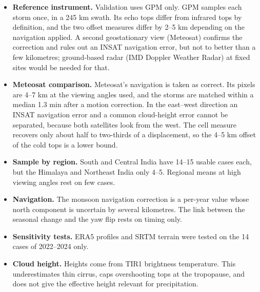 \begin{itemize}
\tightlist
\item
  \textbf{Reference instrument.} Validation uses GPM only. GPM samples each storm once, in a 245 km swath. Its echo tops differ from infrared tops by definition, and the two offset measures differ by 2--5 km depending on the navigation applied. A second geostationary view (Meteosat) confirms the correction and rules out an INSAT navigation error, but not to better than a few kilometres; ground-based radar (IMD Doppler Weather Radar) at fixed sites would be needed for that.
\item
  \textbf{Meteosat comparison.} Meteosat's navigation is taken as correct. Its pixels are 4--7 km at the viewing angles used, and the storms are matched within a median 1.3 min after a motion correction. In the east--west direction an INSAT navigation error and a common cloud-height error cannot be separated, because both satellites look from the west. The cell measure recovers only about half to two-thirds of a displacement, so the 4--5 km offset of the cold tops is a lower bound.
\item
  \textbf{Sample by region.} South and Central India have 14--15 usable cases each, but the Himalaya and Northeast India only 4--5. Regional means at high viewing angles rest on few cases.
\item
  \textbf{Navigation.} The monsoon navigation correction is a per-year value whose north component is uncertain by several kilometres. The link between the seasonal change and the yaw flip rests on timing only.
\item
  \textbf{Sensitivity tests.} ERA5 profiles and SRTM terrain were tested on the 14 cases of 2022--2024 only.
\item
  \textbf{Cloud height.} Heights come from TIR1 brightness temperature. This underestimates thin cirrus, caps overshooting tops at the tropopause, and does not give the effective height relevant for precipitation.
\end{itemize}
